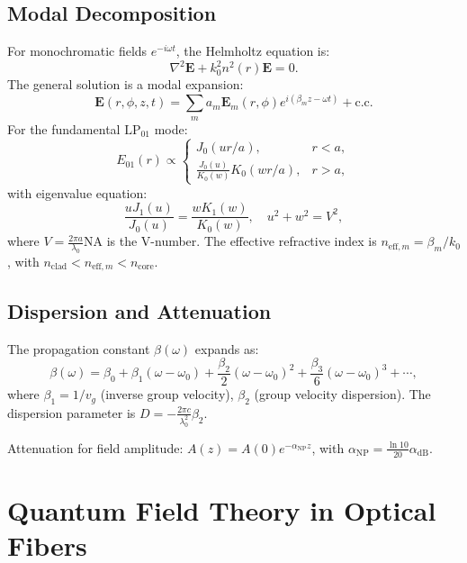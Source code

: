 \documentclass[12pt]{article}
\begin{document}
\subsection{Modal Decomposition}
For monochromatic fields $e^{-i\omega t}$, the Helmholtz equation is:
\begin{equation}
    \nabla^2 \mathbf{E} + k_0^2 n^2(r) \mathbf{E} = 0.
\end{equation}
The general solution is a modal expansion:
\begin{equation}
    \mathbf{E}(r,\phi,z,t) = \sum_m a_m \mathbf{E}_m(r,\phi) e^{i(\beta_m z - \omega t)} + \text{c.c.}
\end{equation}
For the fundamental $\mathrm{LP}_{01}$ mode:
\begin{equation}
    E_{01}(r) \propto 
    \begin{cases}
        J_0(u r/a), & r < a, \\
        \frac{J_0(u)}{K_0(w)} K_0(w r/a), & r > a,
    \end{cases}
\end{equation}
with eigenvalue equation:
\begin{equation}
    \frac{u J_1(u)}{J_0(u)} = \frac{w K_1(w)}{K_0(w)}, \quad u^2 + w^2 = V^2,
\end{equation}
where $V = \frac{2\pi a}{\lambda_0} \mathrm{NA}$ is the V-number. The effective refractive index is $n_{\text{eff},m} = \beta_m/k_0$, with $n_{\text{clad}} < n_{\text{eff},m} < n_{\text{core}}$.

\subsection{Dispersion and Attenuation}
The propagation constant $\beta(\omega)$ expands as:
\begin{equation}
    \beta(\omega) = \beta_0 + \beta_1(\omega - \omega_0) + \frac{\beta_2}{2} (\omega - \omega_0)^2 + \frac{\beta_3}{6} (\omega - \omega_0)^3 + \cdots,
\end{equation}
where $\beta_1 = 1/v_g$ (inverse group velocity), $\beta_2$ (group velocity dispersion). The dispersion parameter is $D = -\frac{2\pi c}{\lambda_0^2} \beta_2$.

Attenuation for field amplitude: $A(z) = A(0) e^{-\alpha_{\text{NP}} z}$, with $\alpha_{\text{NP}} = \frac{\ln 10}{20} \alpha_{\text{dB}}$.

\section{Quantum Field Theory in Optical Fibers}
\end{document}

